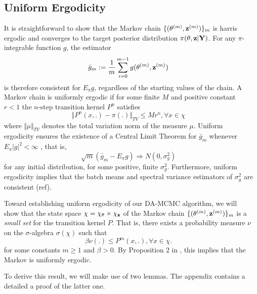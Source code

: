 \documentclass[11pt]{article}
\newcommand{\ram}[1]{{\color{green}{ #1}}}
\begin{document}
	\subsection{Uniform Ergodicity}
	
	It is straightforward to show that the Markov chain $\{(\theta^{(m)}, \mathbf{z}^{(m)})\}_m$ is harris ergodic and converges to the target posterior distribution $\pi(\theta, \mathbf{z}|\mathbf{Y})$. For any $\pi$-integrable function $g$, the estimator
	$$\bar{g}_m := \frac{1}{m} \sum_{i=0}^{m-1} g(\theta^{(m)}, \mathbf{z}^{(m)})$$
	is therefore consistent for $E_\pi g$, regardless of the starting values of the chain. A Markov chain is uniformly ergodic if for some finite $M$ and positive constant $r<1$ the $n$-step transition kernel $P^n$ satisfies
	$$
	\Vert P^n(x,.)-\pi(.)\Vert_{TV} \le M r^n, \forall x \in \chi
	$$
	where $\Vert \mu \Vert_{TV}$ denotes the total variation norm of the measure $\mu$.
	Uniform ergodicity ensures the existence of a Central Limit Theorem for $\bar{g}_m$ whenever $E_\pi |g|^2 < \infty$ \cite{Jones.2004}, that is,
	$$\sqrt{m}(\bar{g}_m - E_\pi g) \Rightarrow N(0, \sigma^2_g)$$
	for any initial distribution, for some positive, finite $\sigma^2_g$. Furthermore, uniform ergodicity implies that the batch means and spectral variance estimators of $\sigma^2_g$ are consistent (ref).
	
	
	
	Toward establishing uniform ergodicity of our DA-MCMC algorithm, we will show that the state space $\chi = \chi_{\theta}\times\chi_{\mathbf{z}}$ of the Markov chain $\{(\theta^{(m)}, \mathbf{z}^{(m)})\}_m$ is a \textit{small set} for the transition kernel $P$. That is, there exists a probability measure $\nu$ on the $\sigma$-algebra $\sigma(\chi)$ such that
	$$\beta \nu(.) \le P^m(x,.), \forall x\in \chi.$$
	for some constants $m \ge 1$ and $\beta > 0$.
	By Proposition 2 in \cite{Tierney.1994}, this implies that the Markov is uniformly ergodic. 
	
	To derive this result, we will make use of two lemmas. The appendix contains a detailed a proof of the latter one.
	\ram{Figures for lemma 3.1 and 3.2?}
	
\end{document}
